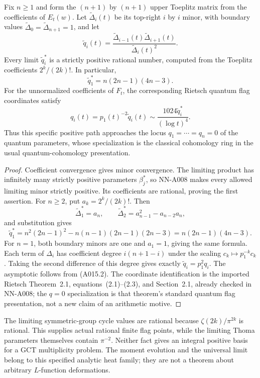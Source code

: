 \begin{corollary}
Fix $n\ge1$ and form the $(n+1)$ by $(n+1)$ upper Toeplitz matrix
from the coefficients of $E_t(w)$. Let $\widetilde\Delta_i(t)$
be its top-right $i$ by $i$ minor, with boundary values
$\widetilde\Delta_0=\widetilde\Delta_{n+1}=1$, and let
\[
 \widetilde q_i(t)=
 \frac{\widetilde\Delta_{i-1}(t)\widetilde\Delta_{i+1}(t)}
 {\widetilde\Delta_i(t)^2}.
\]
Every limit $\widetilde q_i^*$ is a strictly positive rational number,
computed from the Toeplitz coefficients $2^k/(2k)!$. In particular,
\[
 \widetilde q_1^*=n(2n-1)(4n-3).
\]
For the unnormalized coefficients of $F_t$, the corresponding
Rietsch quantum flag coordinates satisfy
\[
 q_i(t)=p_1(t)^{-2}\widetilde q_i(t)
 \sim\frac{1024\widetilde q_i^*}{(\log t)^4}.
\]
Thus this specific positive path approaches the locus $q_1=\cdots=q_n=0$
of the quantum parameters, whose specialization is the classical
cohomology ring in the usual quantum-cohomology presentation.
\end{corollary}
\begin{proof}
Coefficient convergence gives minor convergence. The limiting product
has infinitely many strictly positive parameters $\beta_j^*$, so
NN-A008 makes every allowed limiting minor strictly positive. Its
coefficients are rational, proving the first assertion. For $n\ge2$,
put $a_k=2^k/(2k)!$. Then
\[
 \widetilde\Delta_1^*=a_n,\qquad
 \widetilde\Delta_2^*=a_{n-1}^2-a_{n-2}a_n,
\]
and substitution gives
\[
 \widetilde q_1^*=
 n^2(2n-1)^2-n(n-1)(2n-1)(2n-3)
 =n(2n-1)(4n-3).
\]
For $n=1$, both boundary minors are one and $a_1=1$, giving the same
formula. Each term of $\Delta_i$ has coefficient degree
$i(n+1-i)$ under the scaling $c_k\mapsto p_1^{-k}c_k$.
Taking the second difference of this degree gives exactly
$\widetilde q_i=p_1^2q_i$. The asymptotic follows from (A015.2).
The coordinate identification is the imported Rietsch Theorem~2.1,
equations~(2.1)--(2.3), and Section~2.1, already checked in NN-A008;
the $q=0$ specialization is that theorem's standard quantum flag
presentation, not a new claim of an arithmetic motive.
\end{proof}

The limiting symmetric-group cycle values are rational because
$\zeta(2k)/\pi^{2k}$ is rational. This supplies actual rational finite
flag points, while the limiting Thoma parameters themselves contain
$\pi^{-2}$. Neither fact gives an integral positive basis for a GCT
multiplicity problem. The moment evolution and the universal limit
belong to this specified analytic heat family; they are not a theorem
about arbitrary $L$-function deformations.


